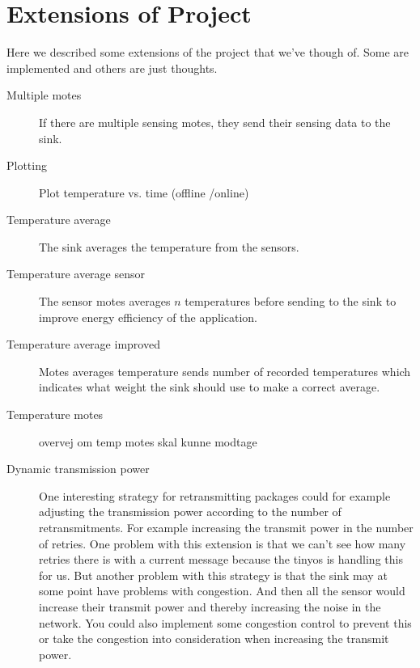 \section{Extensions of Project}
Here we described some extensions of the project that we've though of. Some are implemented and others are just thoughts.
\begin{description}
\item[Multiple motes] If there are multiple sensing motes, they send their sensing data to the sink.
\item[Plotting] Plot temperature vs. time (offline /online)
\item[Temperature average] The sink averages the temperature from the sensors.
\item[Temperature average sensor] The sensor motes averages $n$ temperatures before sending to the sink to improve energy efficiency of the application.
\item[Temperature average improved] Motes averages temperature sends number of recorded temperatures which indicates what weight the sink should use to make a correct average.
\item[Temperature motes] overvej om temp motes skal kunne modtage 
\item[Dynamic transmission power] One interesting strategy for retransmitting packages could for example adjusting the transmission power according to the number of retransmitments. For example increasing the transmit power in the number of retries. One problem with this extension is that we can't see how many retries there is with a current message because the tinyos is handling this for us. But another problem with this strategy is that the sink may at some point have problems with congestion. And then all the sensor would increase their transmit power and thereby increasing the noise in the network. You could also implement some congestion control to prevent this or take the congestion into consideration when increasing the transmit power.
\end{description}
